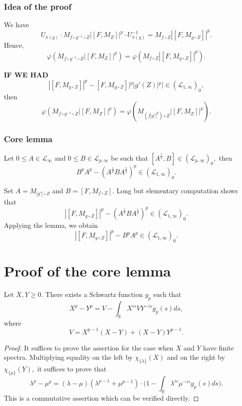 \documentclass{beamer}
\theoremstyle{definition}
\begin{document}
\begin{frame}
\frametitle{Idea of the proof}
We have
$$U_{\pi(g)}\cdot M_{f\circ g^{-1}\circ Z}|[F,M_Z]|^p\cdot U_{\pi(g)}^{-1}=M_{f\circ Z}|[F,M_{g\circ Z}]|^p.$$
Hence,
$$\varphi(M_{f\circ g^{-1}\circ Z}|[F,M_Z]|^p)=\varphi(M_{f\circ Z}|[F,M_{g\circ Z}]|^p).$$

{\bf IF WE HAD}
$$|[F,M_{g\circ Z}]|^p-[F,M_{g\circ Z}]|^p|g'(Z)|^p|\in (\mathcal{L}_{1,\infty})_0,$$
then
$$\varphi(M_{f\circ g^{-1}\circ Z}|[F,M_Z]|^p)=\varphi(M_{(f|g'|^p)\circ Z}|[F,M_Z]|^p).$$
\end{frame}


\begin{frame}
\frametitle{Core lemma}

\begin{lemma} Let $0\leq A\in\mathcal{L}_{\infty}$ and $0\leq B\in\mathcal{L}_{p,\infty}$ be such that $[A^{\frac12},B]\in (\mathcal{L}_{p,\infty})_0,$ then
$$B^pA^p-(A^{\frac12}BA^{\frac12})^p\in (\mathcal{L}_{1,\infty})_0.$$
\end{lemma}

Set $A=M_{|g'|\circ Z}$ and $B=[F,M_{f\circ Z}].$ Long but elementary computation shows that
$$|[F,M_{g\circ Z}]|^p-(A^{\frac12}BA^{\frac12})^p\in (\mathcal{L}_{1,\infty})_0.$$
Applying the lemma, we obtain
$$|[F,M_{g\circ Z}]|^p-B^pA^p\in (\mathcal{L}_{1,\infty})_0.$$
\end{frame}

\section{Proof of the core lemma}

\begin{frame}
\begin{lemma} Let $X,Y\geq0.$ There exists a Schwartz function $g_p$ such that
$$X^p-Y^p=V-\int_{\mathbb{R}}X^{is}VY^{-is}g_p(s)ds,$$
where
$$V=X^{p-1}(X-Y)+(X-Y)Y^{p-1}.$$
\end{lemma}
\begin{proof} It suffices to prove the assertion for the case when $X$ and $Y$ have finite spectra. Multiplying equality on the left by $\chi_{\{\lambda\}}(X)$ and on the right by $\chi_{\{\mu\}}(Y),$ it suffices to prove that
$$\lambda^p-\mu^p=(\lambda-\mu)(\lambda^{p-1}+\mu^{p-1})\cdot\Big(1-\int_{\mathbb{R}}\lambda^{is}\mu^{-is}g_p(s)ds\Big).$$
This is a commutative assertion which can be verified directly.
\end{proof}
\end{frame}
\end{document}
